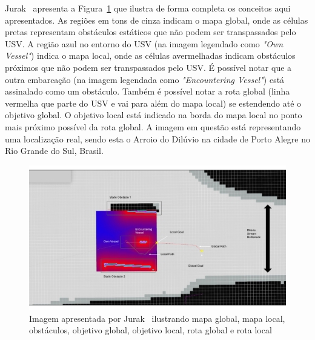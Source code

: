        Jurak~\cite{Jurak2020COLREGS} apresenta a Figura~\ref{fig:chap3_sistema_base_costmaps} que ilustra de forma completa os conceitos aqui apresentados. As regiões em tons de cinza indicam o mapa global, onde as células pretas representam obstáculos estáticos que não podem ser transpassados pelo USV. A região azul no entorno do USV (na imagem legendado como \textit{"Own Vessel"}) indica o mapa local, onde as células avermelhadas indicam obstáculos próximos que não podem ser transpassados pelo USV. É possível notar que a outra embarcação (na imagem legendada como \textit{"Encountering Vessel"}) está assinalado como um obstáculo. Também é possível notar a rota global (linha vermelha que parte do USV e vai para além do mapa local) se estendendo até o objetivo global. O objetivo local está indicado na borda do mapa local no ponto mais próximo possível da rota global. A imagem em questão está representando uma localização real, sendo esta o Arroio do Dilúvio na cidade de Porto Alegre no Rio Grande do Sul, Brasil.
       
       \begin{figure}
           \centering
           \includegraphics[scale=0.65]{fig/chap3/costmaps.pdf}
           \caption{Imagem apresentada por Jurak~\cite{Jurak2020COLREGS} ilustrando mapa global, mapa local, obstáculos, objetivo global, objetivo local, rota global e rota local}
           \label{fig:chap3_sistema_base_costmaps}
       \end{figure}
